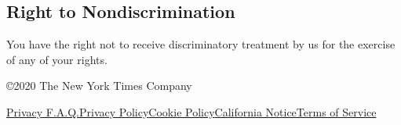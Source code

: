 \hypertarget{right-to-nondiscrimination}{%
\subsection{Right to
Nondiscrimination}\label{right-to-nondiscrimination}}

You have the right not to receive discriminatory treatment by us for the
exercise of any of your rights.

©2020 The New York Times Company

\href{/privacy}{Privacy F.A.Q.}\href{/privacy/privacy-policy}{Privacy
Policy}\href{/privacy/cookie-policy}{Cookie
Policy}\href{/privacy/california-notice}{California
Notice}\href{https://help.nytimes.com/hc/en-us/articles/115014893428-Terms-of-service}{Terms
of Service}
